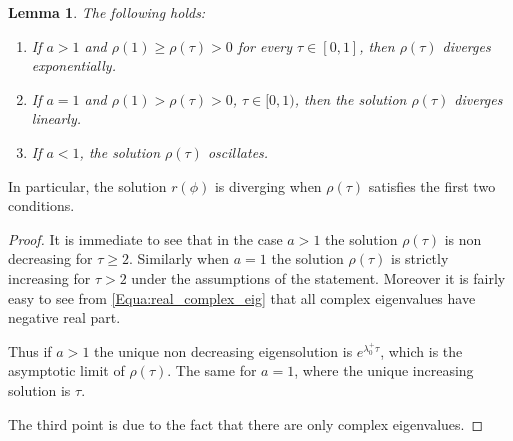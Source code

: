 \documentclass[reqno]{amsart}
\newcounter{assu}
\theoremstyle{definition} \newtheorem{definition}{Definition}[section]
\theoremstyle{definition} \newtheorem{remark}[definition]{Remark}
\theoremstyle{plain} \newtheorem{lemma}[definition]{Lemma}
\theoremstyle{plain} \newtheorem{proposition}[definition]{Proposition}
\theoremstyle{plain} \newtheorem{theorem}[definition]{Theorem}
\theoremstyle{plain} \newtheorem{corollary}[definition]{Corollary}
\theoremstyle{definition} \newtheorem{example}[definition]{Example}
\theoremstyle{plain} \newtheorem{claim}[clai]{Claim}
\theoremstyle{definition} \newtheorem{assumption}[definition]{Assumption}
\theoremstyle{definition} \newtheorem{observation}[definition]{Observation}
\newcommand{\1}{\mathbbm 1}
\numberwithin{equation}{section} %
\theoremstyle{plain} \newtheorem*{theorem*}{Theorem}
\theoremstyle{plain} \newtheorem{mthm}[maintheorem]{Main Theorem}
\theoremstyle{plain} \newtheorem*{mthm*}{Main Theorem}
\theoremstyle{plain} \newtheorem*{conjecture*}{Conjecture}
\theoremstyle{plain} \newtheorem{conjecture}[definition]{Conjecture}
\theoremstyle{plain} \newtheorem*{problem*}{Problem}
\begin{document}
\begin{lemma}
\label{lem:key}
The following holds:
\begin{enumerate}
\item If $a > 1$ and $\rho(1) \geq \rho(\tau) > 0$ for every $\tau \in [0,1]$, then $\rho(\tau)$ diverges exponentially.

\item If $a = 1$ and $\rho(1) > \rho(\tau) > 0$, $\tau \in [0,1)$, then the solution $\rho(\tau)$ diverges linearly.

\item If $a < 1$, the solution $\rho(\tau)$ oscillates.
\end{enumerate}
\end{lemma}

In particular, the solution $r(\phi)$ is diverging when $\rho(\tau)$ satisfies the first two conditions.

\begin{proof}
It is immediate to see that in the case $a > 1$ the solution $\rho(\tau)$ is non decreasing  for $\tau \geq 2$. Similarly when $a = 1$ the solution $\rho(\tau)$ is strictly increasing for $\tau > 2$ under the assumptions of the statement. Moreover it is fairly easy to see from \eqref{Equa:real_complex_eig} that all complex eigenvalues have negative real part.

Thus if $a > 1$ the unique non decreasing eigensolution is $e^{\lambda_0^+ \tau}$, which is the asymptotic limit of $\rho(\tau)$. The same for $a = 1$, where the unique increasing solution is $\tau$.

The third point is due to the fact that there are only complex eigenvalues.
%
%
\end{proof}
\end{document}
